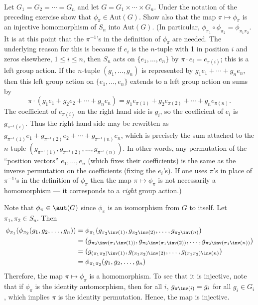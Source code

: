 \begin{exercise}\label{ex5.1.8}
    Let $G_1 = G_2 = \cdots = G_n$ and let $G = G_1 \times \cdots \times G_n$. Under the notation of the preceding exercise show that $\phi_\pi \in \text{Aut}(G)$. Show also that the map $\pi \mapsto \phi_\pi$ is an injective homomorphism of $S_n$ into $\text{Aut}(G)$. (In particular, $\phi_{\pi_1} \circ \phi_{\pi_2} = \phi_{\pi_1 \pi_2}$. It is at this point that the $\pi^{-1}$'s in the definition of $\phi_\pi$ are needed. The underlying reason for this is because if $e_i$ is the $n$-tuple with 1 in position $i$ and zeros elsewhere, $1 \leq i \leq n$, then $S_n$ acts on $\{e_1, \ldots, e_n\}$ by $\pi \cdot e_i = e_{\pi(i)}$; this is a left group action. If the $n$-tuple $(g_1, \ldots, g_n)$ is represented by $g_1 e_1 + \cdots + g_n e_n$, then this left group action on $\{e_1, \ldots, e_n\}$ extends to a left group action on sums by
    \[\pi \cdot (g_1 e_1 + g_2 e_2 + \cdots + g_n e_n) = g_1 e_{\pi(1)} + g_2 e_{\pi(2)} + \cdots + g_n e_{\pi(n)}.\]
    The coefficient of $e_{\pi(i)}$ on the right hand side is $g_i$, so the coefficient of $e_i$ is $g_{\pi^{-1}(i)}$. Thus the right hand side may be rewritten as $g_{\pi^{-1}(1)} e_1 + g_{\pi^{-1}(2)} e_2 + \cdots + g_{\pi^{-1}(n)} e_n$, which is precisely the sum attached to the $n$-tuple $(g_{\pi^{-1}(1)}, g_{\pi^{-1}(2)}, \ldots, g_{\pi^{-1}(n)})$. In other words, any permutation of the ``position vectors'' $e_1, \ldots, e_n$ (which fixes their coefficients) is the same as the inverse permutation on the coefficients (fixing the $e_i$'s). If one uses $\pi$'s in place of $\pi^{-1}$'s in the definition of $\phi_\pi$ then the map $\pi \mapsto \phi_\pi$ is not necessarily a homomorphism --- it corresponds to a \textit{right} group action.)
\end{exercise}

\begin{sol}
    Note that $\phi_\pi \in \aut(G)$ since $\phi_\pi$ is an isomorphism from $G$ to itself. Let $\pi_1, \pi_2 \in S_n$. Then
    \begin{align*}
        \phi_{\pi_1}(\phi_{\pi_2}(g_1, g_2, \ldots, g_n)) & = \phi_{\pi_1}(g_{\pi_2\inv(1)}, g_{\pi_2\inv(2)}, \ldots, g_{\pi_2\inv(n)}) \\
        & = (g_{\pi_2\inv(\pi_1\inv(1))}, g_{\pi_2\inv(\pi_1\inv(2))}, \ldots, g_{\pi_2\inv(\pi_1\inv(n))}) \\
        & = (g_{(\pi_1 \pi_2)\inv(1)}, g_{(\pi_1 \pi_2)\inv(2)}, \ldots, g_{(\pi_1 \pi_2)\inv(n)}) \\
        & = \phi_{\pi_1 \pi_2}(g_1, g_2, \ldots, g_n)
    \end{align*}
    Therefore, the map $\pi \mapsto \phi_\pi$ is a homomorphism. To see that it is injective, note that if $\phi_\pi$ is the identity automorphism, then for all $i$, $g_{\pi\inv(i)} = g_i$ for all $g_i \in G_i$, which implies $\pi$ is the identity permutation. Hence, the map is injective.
\end{sol}

